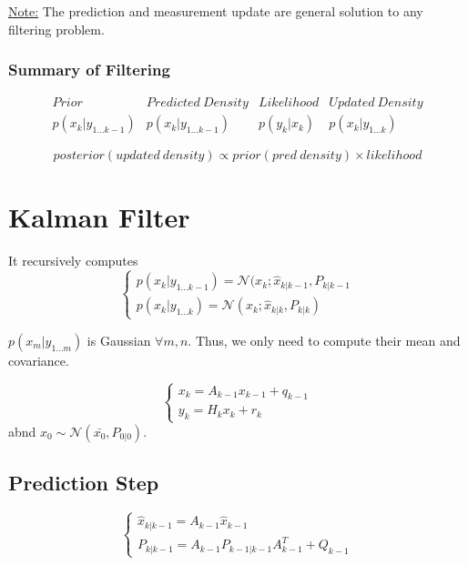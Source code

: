 \underline{Note:} The prediction and measurement update are general solution to any filtering problem.

\subsubsection{Summary of Filtering}
\begin{equation}
\begin{array}{cccc}
    Prior & Predicted \: Density & Likelihood & Updated \: Density \\
    p(x_k|y_{1\dots k-1}) & p(x_k|y_{1\dots k-1}) & p(y_k | x_k) & p(x_k|y_{1\dots k})
\end{array}
\end{equation}

\begin{equation}
    posterior(updated\:density) \propto prior(pred\:density) \times likelihood
\end{equation}

\section{Kalman Filter}

It recursively computes
\begin{equation}
    \left\{\begin{array}{c}
        p(x_k |y_{1\dots k-1}) = \mathcal{N}(x_k; \hat{x}_{k|k-1}, P_{k|k-1} \\
        p(x_k|y_{1\dots k}) = \mathcal{N}(x_k; \hat{x}_{k|k}, P_{k|k}) 
    \end{array}\right.
\end{equation}

$p(x_m|y_{1\dots m})$ is Gaussian $\forall m, n$. Thus, we only need to compute their mean and covariance.

\begin{equation}
    \left\{\begin{array}{c}
        x_k = A_{k-1} x_{k-1} + q_{k-1} \\
        y_k = H_k x_k + r_k
    \end{array}\right.
\end{equation}
abnd $x_0 \sim \mathcal{N}(\bar{x_0}, P_{0|0})$.

\subsection{Prediction Step}
\begin{equation}
\left\{\begin{array}{c}
        \hat{x}_{k|k-1} = A_{k-1} \hat{x}_{k-1}  \\
        P_{k|k-1} = A_{k-1} P_{k-1|k-1} A_{k-1}^T + Q_{k-1}
    \end{array}\right.
\end{equation}

